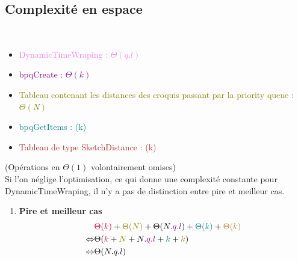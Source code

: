 \documentclass[a4paper, 11pt]{article}
\begin{document}
\subsection{\textbf{Complexité en espace}}\\
    
    \begin{itemize}
    
    \item \textcolor{violet}{DynamicTimeWraping :  $\Theta(q.l)$}\\
    
    \item \textcolor{purple}{bpqCreate : $\Theta(k)$}\\
    
    \item \textcolor{olive}{Tableau contenant les distances des croquis passant par la priority queue : $\Theta(N)$}\\
    
    \item \textcolor{teal}{bpqGetItems : \Theta(k)}\\
    
    \item \textcolor{brown}{Tableau de type SketchDistance : \Theta(k)}\\
    
    \end{itemize}
    
    (Opérations en $\Theta(1)$ volontairement omises)\\
    
    Si l'on néglige l’optimisation, ce qui donne une complexité constante pour DynamicTimeWraping, il n'y a pas de distinction entre pire et meilleur cas.\\
    \begin{enumerate}
    
    \item \textbf{Pire et meilleur cas}\\
    \begin{align*}
    & \textcolor{purple}{\Theta(k)} + \textcolor{olive}{\Theta(N)} + \Theta(N.\textcolor{violet}{q.l}) + \textcolor{teal}{\Theta(k)} + \textcolor{brown}{\Theta(k)}\\
    \Leftrightarrow & \Theta(\textcolor{purple}{k}+\textcolor{olive}{N}+N.\textcolor{violet}{q.l}+\textcolor{teal}{k}+\textcolor{brown}{k})\\
    \Leftrightarrow & \Theta(N.q.l)
    \end{align*}
    
    \end{enumerate}
\end{document}
